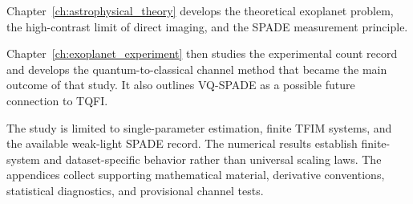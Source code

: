 Chapter~\ref{ch:astrophysical_theory} develops the theoretical exoplanet problem, the high-contrast limit of direct imaging, and the SPADE measurement principle.

Chapter~\ref{ch:exoplanet_experiment} then studies the experimental count record and develops the quantum-to-classical channel method that became the main outcome of that study.  It also outlines VQ-SPADE as a possible future connection to TQFI.

The study is limited to single-parameter estimation, finite TFIM systems, and the available weak-light SPADE record.  The numerical results establish finite-system and dataset-specific behavior rather than universal scaling laws.  The appendices collect supporting mathematical material, derivative conventions, statistical diagnostics, and provisional channel tests.
